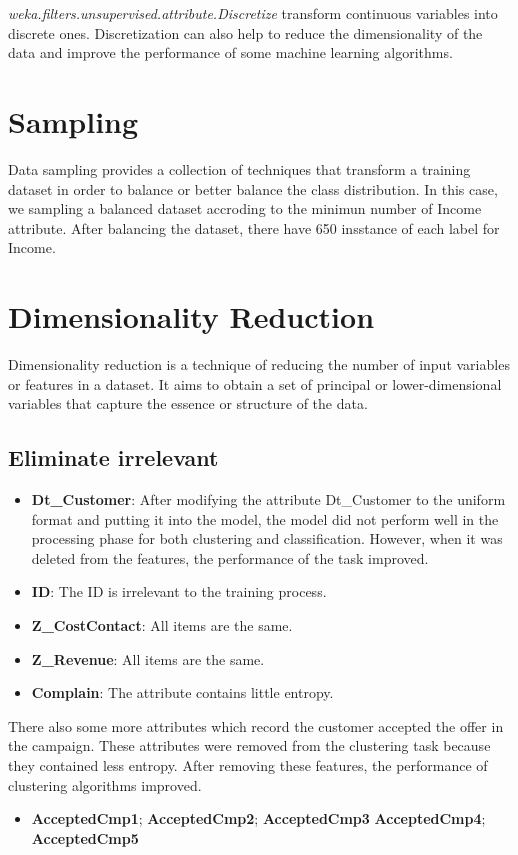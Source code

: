 \textit{weka.filters.unsupervised.attribute.Discretize} transform continuous variables into discrete ones. Discretization can also help to reduce the dimensionality of the data and improve the performance of some machine learning algorithms.

\section{Sampling}
Data sampling provides a collection of techniques that transform a training dataset in order to balance or better balance the class distribution.
In this case, we sampling a balanced dataset accroding to the minimun number of Income attribute. After balancing the dataset, there have 650 insstance of each label for Income.
\section{Dimensionality Reduction}
Dimensionality reduction is a technique of reducing the number of input variables or features in a dataset. It aims to obtain a set of principal or lower-dimensional variables that capture the essence or structure of the data.
\subsection{Eliminate irrelevant}

\begin{itemize}
    \item \textbf{Dt\_Customer}: After modifying the attribute Dt\_Customer to the uniform format and putting it into the model, the model did not perform well in the processing phase for both clustering and classification. However, when it was deleted from the features, the performance of the task improved.
    \item \textbf{ID}: The ID is irrelevant to the training process.
    \item \textbf{Z\_CostContact}: All items are the same.
    \item \textbf{Z\_Revenue}: All items are the same.
    \item \textbf{Complain}: The attribute contains little entropy.
\end{itemize}

There also some more attributes which record the customer accepted the offer in the campaign. These attributes were removed from the clustering task because they contained less entropy. After removing these features, the performance of clustering algorithms improved.
\begin{itemize}
    \item \textbf{AcceptedCmp1}; \textbf{AcceptedCmp2}; \textbf{AcceptedCmp3} \textbf{AcceptedCmp4}; \textbf{AcceptedCmp5}
\end{itemize}

